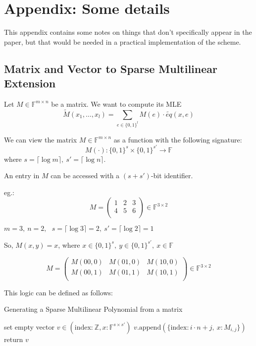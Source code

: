 \documentclass{article}
\theoremstyle{definition}
\begin{document}
\vspace{2cm}

\appendix
\section{Appendix: Some details}
This appendix contains some notes on things that don't specifically appear in the paper, but that would be needed in a practical implementation of the scheme.

\subsection{Matrix and Vector to Sparse Multilinear Extension}

Let $M \in \mathbb{F}^{m \times n}$ be a matrix. We want to compute its MLE
$$\widetilde{M}(x_1, \ldots, x_l) = \sum_{e \in \{0, 1 \}^l} M(e) \cdot \widetilde{eq}(x, e)$$

We can view the matrix $M \in \mathbb{F}^{m \times n}$ as a function with the following signature:
$$M(\cdot): \{0,1\}^s \times \{0,1\}^{s'} \rightarrow \mathbb{F}$$
where $s = \lceil \log m \rceil,~ s' = \lceil \log n \rceil$.

An entry in $M$ can be accessed with a $(s+s')$-bit identifier.

eg.:
$$
M = \begin{pmatrix}
1 & 2 & 3\\
4 & 5 & 6\\
\end{pmatrix}
\in \mathbb{F}^{3 \times 2}
$$

$m = 3,~ n = 2,~~~ s = \lceil \log 3 \rceil = 2,~ s' = \lceil \log 2 \rceil = 1$

So, $M(x, y) = x$, where $x \in \{0,1\}^s,~ y \in \{0,1\}^{s'},~ x \in \mathbb{F}$

$$
M = \begin{pmatrix}
M(00,0) & M(01,0) & M(10,0)\\
M(00,1) & M(01,1) & M(10,1)\\
\end{pmatrix}
\in \mathbb{F}^{3 \times 2}
$$

This logic can be defined as follows:

\begin{algorithm}[H]
\caption{Generating a Sparse Multilinear Polynomial from a matrix}
\begin{algorithmic}
	\State set empty vector $v \in (\text{index:}~ \mathbb{Z}, x: \mathbb{F}^{s \times s'})$
			\State $v.\text{append}( \{ \text{index}: i \cdot n + j,~ x: M_{i,j} \} )$
		\EndIf
	\EndFor
	\EndFor
	\State return $v$    
\end{algorithmic}
\end{algorithm}
\end{document}
